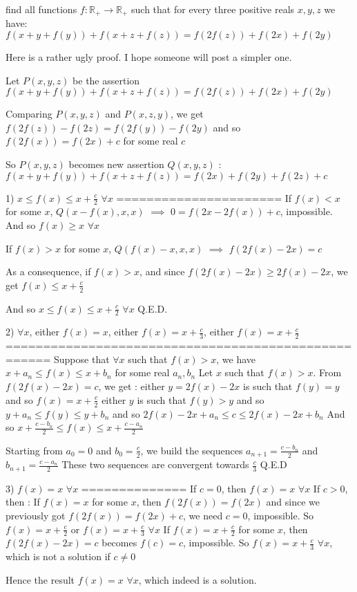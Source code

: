 \begin{solution}
	\begin{tcolorbox}find all functions $f:\mathbb{R}_+\rightarrow \mathbb{R}_+$ such that for every three positive reals $x,y,z$ we have:
$f(x+y+f(y))+f(x+z+f(z))=f(2f(z))+f(2x)+f(2y)$\end{tcolorbox}
Here is a rather ugly proof. I hope someone will post a simpler one.

Let $P(x,y,z)$ be the assertion $f(x+y+f(y))+f(x+z+f(z))=f(2f(z))+f(2x)+f(2y)$

Comparing $P(x,y,z)$ and $P(x,z,y)$, we get $f(2f(z))-f(2z)=f(2f(y))-f(2y)$ and so $f(2f(x))=f(2x)+c$ for some real $c$

So $P(x,y,z)$ becomes new assertion $Q(x,y,z)$ : $f(x+y+f(y))+f(x+z+f(z))=f(2x)+f(2y)+f(2z)+c$

1) $x\le f(x)\le x+\frac c2$ $\forall x$
======================
If $f(x)<x$ for some $x$, $Q(x-f(x),x,x)$ $\implies$ $0=f(2x-2f(x))+c$, impossible. And so $f(x)\ge x$ $\forall x$

If $f(x)>x$ for some $x$, $Q(f(x)-x,x,x)$ $\implies$ $f(2f(x)-2x)=c$

As a consequence, if $f(x)>x$, and since $f(2f(x)-2x)\ge 2f(x)-2x$, we get $f(x)\le x+\frac c2$

And so $x\le f(x)\le x+\frac c2$ $\forall x$
Q.E.D.

2) $\forall x$, either $f(x)=x$, either $f(x)=x+\frac c3$, either $f(x)=x+\frac c2$
====================================================
Suppose that $\forall x$ such that $f(x)>x$, we have $x+a_n\le f(x)\le x+b_n$ for some real $a_n,b_n$
Let $x$ such that $f(x)>x$. From $f(2f(x)-2x)=c$, we get :
either $y=2f(x)-2x$ is such that $f(y)=y$ and so  $f(x)=x+\frac c2$
either $y$ is such that $f(y)>y$ and so $y+a_n\le f(y)\le y+b_n$ and so $2f(x)-2x+a_n\le c\le 2f(x)-2x+b_n$
And so $x+\frac{c-b_n}2\le f(x)\le x+\frac{c-a_n}2$

Starting from $a_0=0$ and $b_0=\frac c2$, we build the sequences $a_{n+1}=\frac{c-b_n}2$ and $b_{n+1}=\frac{c-a_n}2$
These two sequences are convergent towards $\frac c3$
Q.E.D

3) $f(x)=x$ $\forall x$
==============
If $c=0$, then $f(x)=x$ $\forall x$
If $c>0$, then :
If $f(x)=x$ for some $x$, then $f(2f(x))=f(2x)$ and since we previously got $f(2f(x))=f(2x)+c$, we need $c=0$, impossible.
So $f(x)=x+\frac c2$ or $f(x)=x+\frac c3$ $\forall x$
If $f(x)=x+\frac c2$ for some $x$, then $f(2f(x)-2x)=c$ becomes $f(c)=c$, impossible.
So $f(x)=x+\frac c3$ $\forall x$, which is not a solution if $c\ne 0$

Hence the result $\boxed{f(x)=x}$ $\forall x$, which indeed is a solution.
\end{solution}



